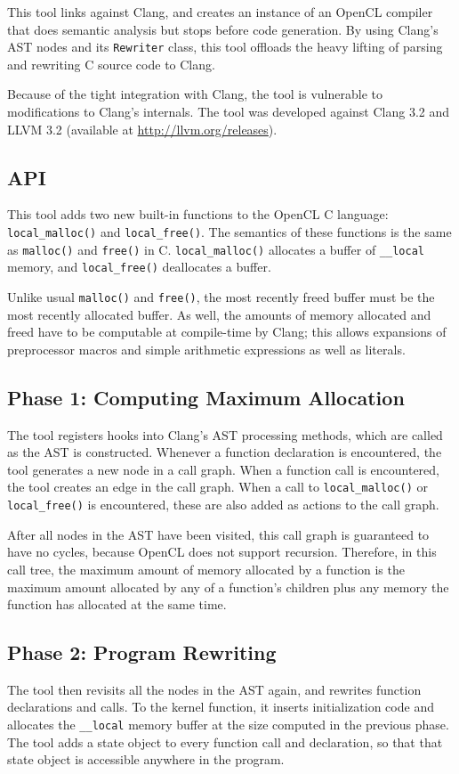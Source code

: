 \documentclass{article}
\begin{document}
This tool links against Clang, and creates an instance of an OpenCL compiler that does semantic analysis but stops before code generation. By using Clang's AST nodes and its \texttt{Rewriter} class, this tool offloads the heavy lifting of parsing and rewriting C source code to Clang.

Because of the tight integration with Clang, the tool is vulnerable to modifications to Clang's internals. The tool was developed against Clang 3.2 and LLVM 3.2 (available at \url{http://llvm.org/releases}).

\subsection{API}
This tool adds two new built-in functions to the OpenCL C language: \texttt{local\_malloc()} and \texttt{local\_free()}. The semantics of these functions is the same as \texttt{malloc()} and \texttt{free()} in C. \texttt{local\_malloc()} allocates a buffer of \texttt{\_\_local} memory, and \texttt{local\_free()} deallocates a buffer.

Unlike usual \texttt{malloc()} and \texttt{free()}, the most recently freed buffer must be the most recently allocated buffer. As well, the amounts of memory allocated and freed have to be computable at compile-time by Clang; this allows expansions of preprocessor macros and simple arithmetic expressions as well as literals.

\subsection{Phase 1: Computing Maximum Allocation}
The tool registers hooks into Clang's AST processing methods, which are called as the AST is constructed. Whenever a function declaration is encountered, the tool generates a new node in a call graph. When a function call is encountered, the tool creates an edge in the call graph. When a call to \texttt{local\_malloc()} or \texttt{local\_free()} is encountered, these are also added as actions to the call graph.

After all nodes in the AST have been visited, this call graph is guaranteed to have no cycles, because OpenCL does not support recursion. Therefore, in this call tree, the maximum amount of memory allocated by a function is the maximum amount allocated by any of a function's children plus any memory the function has allocated at the same time.

\subsection{Phase 2: Program Rewriting}
The tool then revisits all the nodes in the AST again, and rewrites function declarations and calls. To the kernel function, it inserts initialization code and allocates the \texttt{\_\_local} memory buffer at the size computed in the previous phase. The tool adds a state object to every function call and declaration, so that that state object is accessible anywhere in the program.
\end{document}
